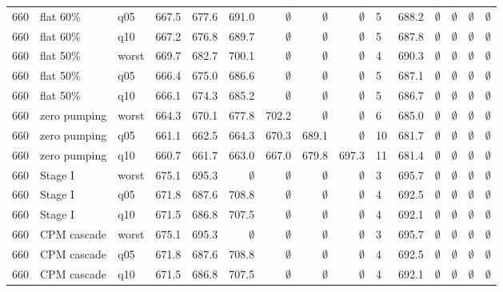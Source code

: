 \begin{longtable}{lllrrrrrrlrrrrr}
660 & flat 60\% & q05 & 667.5 & 677.6 & 691.0 & $\emptyset$ & $\emptyset$ & $\emptyset$ & 5 & 688.2 & $\emptyset$ & $\emptyset$ & $\emptyset$ & $\emptyset$ \\
660 & flat 60\% & q10 & 667.2 & 676.8 & 689.7 & $\emptyset$ & $\emptyset$ & $\emptyset$ & 5 & 687.8 & $\emptyset$ & $\emptyset$ & $\emptyset$ & $\emptyset$ \\
660 & flat 50\% & worst & 669.7 & 682.7 & 700.1 & $\emptyset$ & $\emptyset$ & $\emptyset$ & 4 & 690.3 & $\emptyset$ & $\emptyset$ & $\emptyset$ & $\emptyset$ \\
660 & flat 50\% & q05 & 666.4 & 675.0 & 686.6 & $\emptyset$ & $\emptyset$ & $\emptyset$ & 5 & 687.1 & $\emptyset$ & $\emptyset$ & $\emptyset$ & $\emptyset$ \\
660 & flat 50\% & q10 & 666.1 & 674.3 & 685.2 & $\emptyset$ & $\emptyset$ & $\emptyset$ & 5 & 686.7 & $\emptyset$ & $\emptyset$ & $\emptyset$ & $\emptyset$ \\
660 & zero pumping & worst & 664.3 & 670.1 & 677.8 & 702.2 & $\emptyset$ & $\emptyset$ & 6 & 685.0 & $\emptyset$ & $\emptyset$ & $\emptyset$ & $\emptyset$ \\
660 & zero pumping & q05 & 661.1 & 662.5 & 664.3 & 670.3 & 689.1 & $\emptyset$ & 10 & 681.7 & $\emptyset$ & $\emptyset$ & $\emptyset$ & $\emptyset$ \\
660 & zero pumping & q10 & 660.7 & 661.7 & 663.0 & 667.0 & 679.8 & 697.3 & 11 & 681.4 & $\emptyset$ & $\emptyset$ & $\emptyset$ & $\emptyset$ \\
660 & Stage I & worst & 675.1 & 695.3 & $\emptyset$ & $\emptyset$ & $\emptyset$ & $\emptyset$ & 3 & 695.7 & $\emptyset$ & $\emptyset$ & $\emptyset$ & $\emptyset$ \\
660 & Stage I & q05 & 671.8 & 687.6 & 708.8 & $\emptyset$ & $\emptyset$ & $\emptyset$ & 4 & 692.5 & $\emptyset$ & $\emptyset$ & $\emptyset$ & $\emptyset$ \\
660 & Stage I & q10 & 671.5 & 686.8 & 707.5 & $\emptyset$ & $\emptyset$ & $\emptyset$ & 4 & 692.1 & $\emptyset$ & $\emptyset$ & $\emptyset$ & $\emptyset$ \\
660 & CPM cascade & worst & 675.1 & 695.3 & $\emptyset$ & $\emptyset$ & $\emptyset$ & $\emptyset$ & 3 & 695.7 & $\emptyset$ & $\emptyset$ & $\emptyset$ & $\emptyset$ \\
660 & CPM cascade & q05 & 671.8 & 687.6 & 708.8 & $\emptyset$ & $\emptyset$ & $\emptyset$ & 4 & 692.5 & $\emptyset$ & $\emptyset$ & $\emptyset$ & $\emptyset$ \\
660 & CPM cascade & q10 & 671.5 & 686.8 & 707.5 & $\emptyset$ & $\emptyset$ & $\emptyset$ & 4 & 692.1 & $\emptyset$ & $\emptyset$ & $\emptyset$ & $\emptyset$ \\
\end{longtable}
\endgroup
